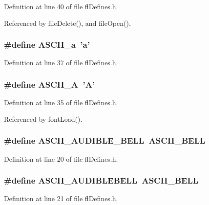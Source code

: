 Definition at line 40 of file fl\-Defines.h.

Referenced by file\-Delete(), and file\-Open().
\subsubsection{\setlength{\rightskip}{0pt plus 5cm}\#define ASCII\_\-a~'a'}\label{flDefines_8h_cb0c7653dabe53da8a7fb03bcad505e7}




Definition at line 37 of file fl\-Defines.h.
\subsubsection{\setlength{\rightskip}{0pt plus 5cm}\#define ASCII\_\-A~'A'}\label{flDefines_8h_6ccdee41712ed103021e82cb944f47e6}




Definition at line 35 of file fl\-Defines.h.

Referenced by font\-Load().
\subsubsection{\setlength{\rightskip}{0pt plus 5cm}\#define ASCII\_\-AUDIBLE\_\-BELL~ASCII\_\-BELL}\label{flDefines_8h_dcfdb1a80427061ef65fcbcd77342d32}




Definition at line 20 of file fl\-Defines.h.
\subsubsection{\setlength{\rightskip}{0pt plus 5cm}\#define ASCII\_\-AUDIBLEBELL~ASCII\_\-BELL}\label{flDefines_8h_cf99cbd210aea2cc887f638003a9e1de}




Definition at line 21 of file fl\-Defines.h.

